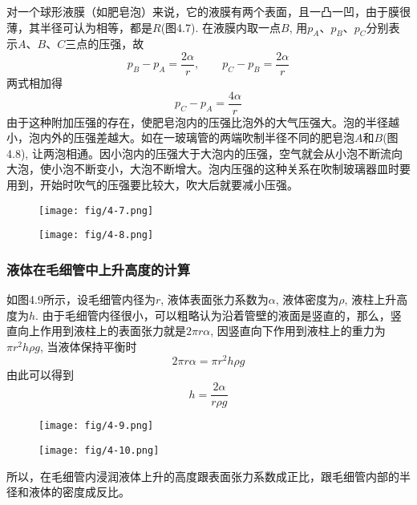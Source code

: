对一个球形液膜（如肥皂泡）来说，它的液膜有两个表面，且一凸一凹，由于膜很薄，其半径可认为相等，都是$R$(图4.7). 在液膜内取一点$B$, 用$p_A$、$p_B$、$p_C$分别表示$A$、$B$、$C$三点的压强，故
\[p_B-p_A=\frac{2\alpha}{r},\qquad p_C-p_B=\frac{2\alpha}{r}\]
两式相加得
\[p_C-p_A=\frac{4\alpha}{r}\]
由于这种附加压强的存在，使肥皂泡内的压强比泡外的大气压强大。泡的半径越小，泡内外的压强差越大。如在一玻璃管的两端吹制半径不同的肥皂泡$A$和$B$(图4.8), 让两泡相通。因小泡内的压强大于大泡内的压强，空气就会从小泡不断流向大泡，使小泡不断变小，大泡不断增大。泡内压强的这种关系在吹制玻璃器皿时要用到，开始时吹气的压强要比较大，吹大后就要减小压强。

\begin{figure}[htp]\centering
    \begin{minipage}[t]{0.48\textwidth}
    \centering
    \texttt{[image: fig/4-7.png]}
    \caption{}
    \end{minipage}
    \begin{minipage}[t]{0.48\textwidth}
    \centering
    \texttt{[image: fig/4-8.png]}
    \caption{}
    \end{minipage}
    \end{figure}


\subsubsection{液体在毛细管中上升高度的计算}


如图4.9所示，设毛细管内径为$r$, 液体表面张力系数为$\alpha$, 液体密度为$\rho$, 液柱上升高度为$h$. 由于毛细管内径很小，可以粗略认为沿着管壁的液面是竖直的，那么，竖直向上作用到液柱上的表面张力就是$2\pi r\alpha$, 因竖直向下作用到液柱上的重力为$\pi r^2h\rho g$, 当液体保持平衡时
\[2\pi r\alpha=\pi r^2h\rho g\]
由此可以得到
\[h=\frac{2\alpha}{r\rho g}\]

\begin{figure}[htp]\centering
    \begin{minipage}[t]{0.48\textwidth}
    \centering
    \texttt{[image: fig/4-9.png]}
    \caption{}
    \end{minipage}
    \begin{minipage}[t]{0.48\textwidth}
    \centering
    \texttt{[image: fig/4-10.png]}
    \caption{}
    \end{minipage}
    \end{figure}

所以，在毛细管内浸润液体上升的高度跟表面张力系数成正比，跟毛细管内部的半径和液体的密度成反比。

